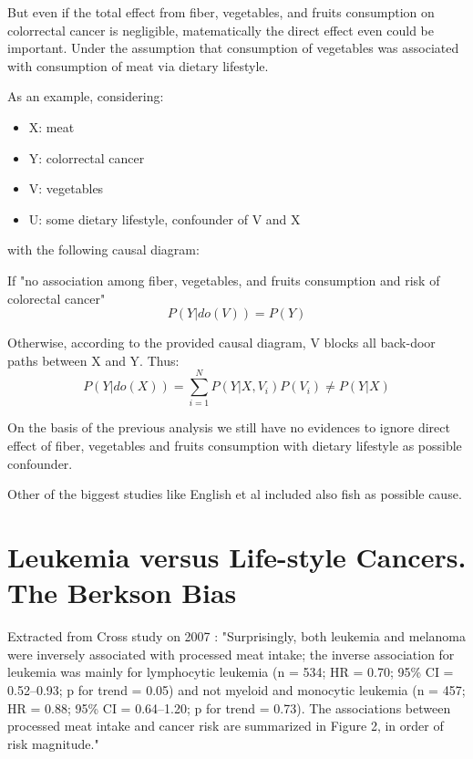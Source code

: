 \documentclass{article}
\begin{document}
But even if the total effect from fiber, vegetables, and fruits consumption on colorrectal cancer is negligible, matematically the direct effect even could be important. Under the assumption that consumption of vegetables was associated with consumption of meat via dietary lifestyle.

As an example, considering:

\begin{itemize}
\item X: meat
\item Y: colorrectal cancer
\item V: vegetables
\item U: some dietary lifestyle, confounder of V and X
\end{itemize}

with the following causal diagram:


If "no association among fiber, vegetables, and fruits consumption and risk of colorectal cancer"
\begin{equation}
  P(Y|do(V))=P(Y)
\end{equation}

Otherwise, according to the provided causal diagram, V blocks all back-door paths between X and Y. Thus:
\begin{equation}
P(Y|do(X))=\sum _{i=1}^{N} P(Y|X,V_i)P(V_i) \neq P (Y|X)
\end{equation}


On the basis of the previous analysis we still have no evidences to ignore direct effect of fiber, vegetables and fruits consumption with dietary lifestyle as possible confounder.

Other of the biggest studies like English et al \cite{english} included also fish as possible cause.

\section{Leukemia versus Life-style Cancers. The Berkson Bias}
\label{sec:cross}

Extracted from Cross study on 2007 \cite{cross}: "Surprisingly, both leukemia and melanoma were inversely associated with processed meat intake; the inverse association for leukemia was mainly for lymphocytic leukemia (n = 534; HR = 0.70; 95\% CI = 0.52–0.93; p for trend = 0.05) and not myeloid and monocytic leukemia (n = 457; HR = 0.88; 95\% CI = 0.64–1.20; p for trend = 0.73). The associations between processed meat intake and cancer risk are summarized in Figure 2, in order of risk magnitude."
\end{document}
